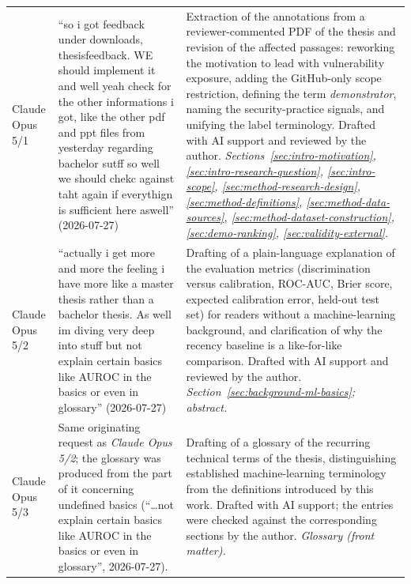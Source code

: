 {\begin{longtable}{p{} p{} p{}}
Claude Opus 5/1
& ``so i got feedback under downloads, thesisfeedback. WE should implement it and well
yeah check for the other informations i got, like the other pdf and ppt files from
yesterday regarding bachelor sutff so well we should chekc against taht again if
everythign is sufficient here aswell'' (2026-07-27)
& Extraction of the annotations from a reviewer-commented PDF of the thesis and revision
of the affected passages: reworking the motivation to lead with vulnerability exposure,
adding the GitHub-only scope restriction, defining the term \emph{demonstrator}, naming
the security-practice signals, and unifying the label terminology. Drafted with AI
support and reviewed by the author. \newline
\emph{Sections~\ref{sec:intro-motivation}, \ref{sec:intro-research-question},
\ref{sec:intro-scope}, \ref{sec:method-research-design},
\ref{sec:method-definitions}, \ref{sec:method-data-sources},
\ref{sec:method-dataset-construction}, \ref{sec:demo-ranking},
\ref{sec:validity-external}.} \\

Claude Opus 5/2
& ``actually i get more and more the feeling i have more like a master thesis rather
than a bachelor thesis. As well im diving very deep into stuff but not explain certain
basics like AUROC in the basics or even in glossary'' (2026-07-27)
& Drafting of a plain-language explanation of the evaluation metrics (discrimination
versus calibration, ROC-AUC, Brier score, expected calibration error, held-out test set)
for readers without a machine-learning background, and clarification of why the recency
baseline is a like-for-like comparison. Drafted with AI support and reviewed by the
author. \newline \emph{Section~\ref{sec:background-ml-basics}; abstract.} \\

Claude Opus 5/3
& Same originating request as \emph{Claude Opus 5/2}; the glossary was produced from the
part of it concerning undefined basics (``\ldots{}not explain certain basics like AUROC
in the basics or even in glossary'', 2026-07-27).
& Drafting of a glossary of the recurring technical terms of the thesis, distinguishing
established machine-learning terminology from the definitions introduced by this work.
Drafted with AI support; the entries were checked against the corresponding sections by
the author. \newline \emph{Glossary (front matter).} \\


\end{longtable}}
